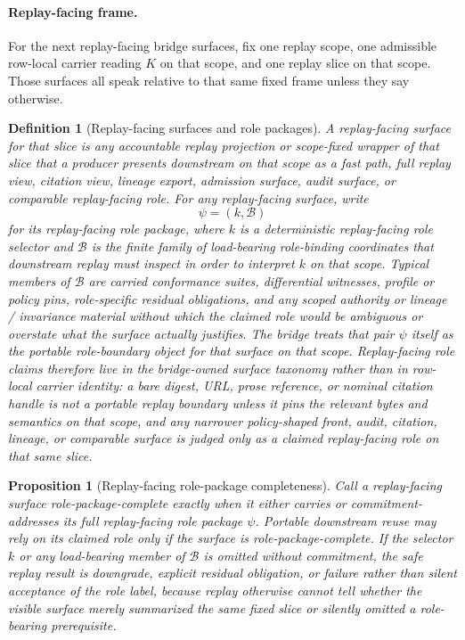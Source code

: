 \documentclass[11pt]{article}
\newtheorem{definition}{Definition}
\newtheorem{proposition}{Proposition}
\begin{document}
\paragraph{Replay-facing frame.}
For the next replay-facing bridge surfaces, fix one replay scope, one admissible row-local carrier reading $K$ on that scope, and one replay slice on that scope.
Those surfaces all speak relative to that same fixed frame unless they say otherwise.

\begin{definition}[Replay-facing surfaces and role packages]
A \emph{replay-facing surface} for that slice is any accountable replay projection or scope-fixed wrapper of that slice that a producer presents downstream on that scope as a fast path, full replay view, citation view, lineage export, admission surface, audit surface, or comparable replay-facing role.
For any replay-facing surface, write
\[
\psi=(k,\mathcal{B})
\]
for its \emph{replay-facing role package}, where $k$ is a deterministic replay-facing role selector and $\mathcal{B}$ is the finite family of load-bearing role-binding coordinates that downstream replay must inspect in order to interpret $k$ on that scope.
Typical members of $\mathcal{B}$ are carried conformance suites, differential witnesses, profile or policy pins, role-specific residual obligations, and any scoped authority or lineage / invariance material without which the claimed role would be ambiguous or overstate what the surface actually justifies.
The bridge treats that pair $\psi$ itself as the portable role-boundary object for that surface on that scope.
Replay-facing role claims therefore live in the bridge-owned surface taxonomy rather than in row-local carrier identity: a bare digest, URL, prose reference, or nominal citation handle is not a portable replay boundary unless it pins the relevant bytes and semantics on that scope, and any narrower policy-shaped front, audit, citation, lineage, or comparable surface is judged only as a claimed replay-facing role on that same slice.
\end{definition}

\begin{proposition}[Replay-facing role-package completeness]
Call a replay-facing surface \emph{role-package-complete} exactly when it either carries or commitment-addresses its full replay-facing role package $\psi$.
Portable downstream reuse may rely on its claimed role only if the surface is role-package-complete.
If the selector $k$ or any load-bearing member of $\mathcal{B}$ is omitted without commitment, the safe replay result is downgrade, explicit residual obligation, or failure rather than silent acceptance of the role label, because replay otherwise cannot tell whether the visible surface merely summarized the same fixed slice or silently omitted a role-bearing prerequisite.
\end{proposition}
\end{document}
